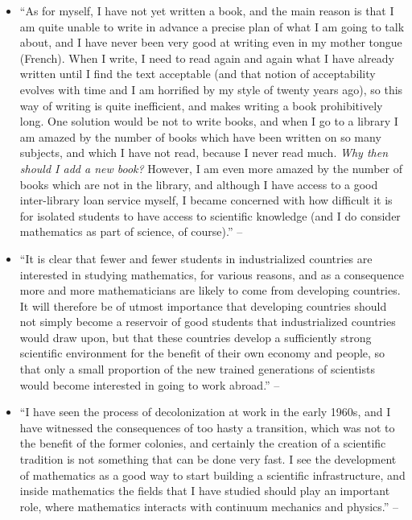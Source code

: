 \documentclass[oneside]{book}
\numberwithin{equation}{section}
\begin{document}
\begin{enumerate}
\begin{itemize}
		\item ``As for myself, I have not yet written a book, and the main reason is that I am quite unable to write in advance a precise plan of what I am going to talk about, and I have never been very good at writing even in my mother tongue (French). When I write, I need to read again and again what I have already written until I find the text acceptable (and that notion of acceptability evolves with time and I am horrified by my style of twenty years ago), so this way of writing is quite inefficient, and makes writing a book prohibitively long. One solution would be not to write books, and when I go to a library I am amazed by the number of books which have been written on so many subjects, and which I have not read, because I never read much. \textit{Why then should I add a new book?} However, I am even more amazed by the number of books which are not in the library, and although I have access to a good inter-library loan service myself, I became concerned with how difficult it is for isolated students to have access to scientific knowledge (and I do consider mathematics as part of science, of course).'' -- \cite[Preface, p. ix]{Tartar2006}
		\item ``It is clear that fewer and fewer students in industrialized countries are interested in studying mathematics, for various reasons, and as a consequence more and more mathematicians are likely to come from developing countries. It will therefore be of utmost importance that developing countries should not simply become a reservoir of good students that industrialized countries would draw upon, but that these countries develop a sufficiently strong scientific environment for the benefit of their own economy and people, so that only a small proportion of the new trained generations of scientists would become interested in going to work abroad.'' -- \cite[Preface, p. ix]{Tartar2006}
		\item ``I have seen the process of decolonization at work in the early 1960s, and I have witnessed the consequences of too hasty a transition, which was not to the benefit of the former colonies, and certainly the creation of a scientific tradition is not something that can be done very fast. I see the development of mathematics as a good way to start building a scientific infrastructure, and inside mathematics the fields that I have studied should play an important role, where mathematics interacts with continuum mechanics and physics.'' -- \cite[Preface, pp. ix--x]{Tartar2006}

\end{itemize}
\end{enumerate}
\end{document}
